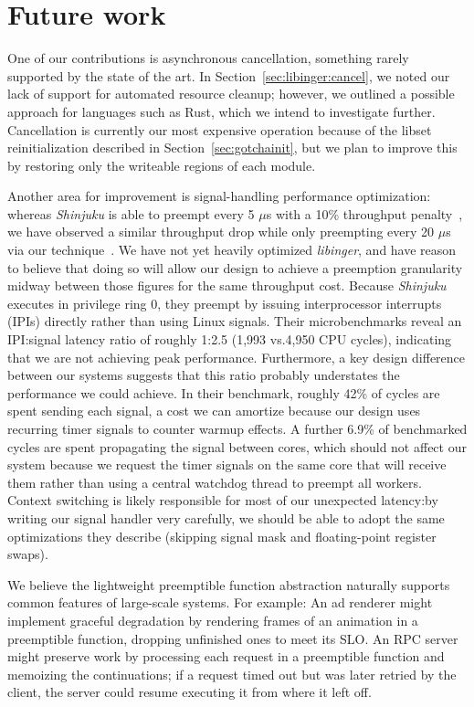 \section{Future work}

One of our contributions is asynchronous cancellation, something rarely supported by
the state of the art.  In Section~\ref{sec:libinger:cancel}, we noted our lack of
support for automated resource cleanup; however, we outlined a possible approach for
languages such as Rust, which we intend to investigate further.  Cancellation is
currently
our most expensive operation because of the libset reinitialization described in
Section~\ref{sec:gotchainit}, but we plan to improve this by restoring only the
writeable regions of each module.

Another area for improvement is signal-handling performance optimization: whereas
\textit{Shinjuku} is able to preempt every 5 $\mu$s with a 10\% throughput
penalty~\cite{Kaffes:nsdi2019}, we have observed a similar throughput drop while only
preempting every 20 $\mu$s via our technique~\cite{boucher:atc2018}.  We have not yet
heavily optimized \textit{libinger}, and have reason to believe that doing so will
allow our design to achieve a preemption granularity midway between those figures
for the same throughput cost.  Because \textit{Shinjuku} executes in privilege ring
0, they preempt by issuing interprocessor interrupts (IPIs) directly rather than
using Linux signals.  Their microbenchmarks reveal an IPI:signal latency ratio of
roughly 1:2.5 (1,993 vs.\@ 4,950 CPU cycles), indicating that we are not achieving
peak performance.  Furthermore, a key design difference between our systems suggests
that this ratio probably understates the performance we could achieve.  In their
benchmark, roughly 42\% of cycles are spent sending each signal, a cost we can
amortize because our design uses recurring timer signals to counter warmup effects.
A further 6.9\% of benchmarked cycles are spent propagating the signal between cores,
which should not affect our system because we request the timer signals on the same
core that will receive them rather than using a central watchdog thread to preempt
all workers.  Context switching is likely responsible for most of our unexpected
latency:\@ by writing our signal handler very carefully, we should be able to adopt
the same optimizations they describe (skipping signal mask and floating-point
register swaps).

We believe the lightweight preemptible function abstraction naturally supports
common features of large-scale systems.  For example:  An ad renderer might implement
graceful degradation by rendering frames of an animation in a preemptible function,
dropping unfinished ones to meet its SLO.  An RPC server might preserve work by
processing each request in a preemptible function and memoizing the continuations; if
a request timed out but was later retried by the client, the server could resume
executing it from where it left off.

